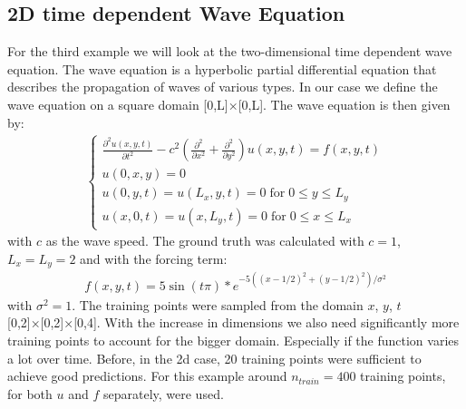 \documentclass{article}
\begin{document}
\subsection{2D time dependent Wave Equation}
For the third example we will look at the two-dimensional time dependent wave equation. The wave equation is a hyperbolic partial differential equation that describes the propagation of waves of various types. In our case we define the wave equation on a square domain [0,L]×[0,L]. The wave equation is then given by:
\begin{equation}
    \begin{aligned}
{\displaystyle {\begin{cases}    \frac{\partial^2 u(x,y,t)}{\partial t^2} - c^2\left(\frac{\partial^2}{\partial x^2} +\frac{\partial^2}{\partial y^2}\right)u(x,y,t) = f(x,y,t) \\ 
    u(0,x,y) = 0\\ 
    u(0,y,t)=u(L_x,y,t)=0 \; \mathrm{for} \;0 \leq y \leq L_y\\
    u(x,0,t)=u(x,L_y,t)=0 \; \mathrm{for}\; 0 \leq x \leq L_x
    \end{cases}}}
    \end{aligned}
\end{equation}
with $c$ as the wave speed. The ground truth was calculated with $c = 1$, $L_x = L_y = 2$ and with the forcing term:
\begin{align}
  f(x,y,t) = 5\sin(t\pi)*e^{-5((x - 1/2)^2 + (y - 1/2)^2)/\sigma^2}  
\end{align}
with $\sigma^2 = 1$. The training points were sampled from the domain $x$, $y$, $t$ [0,2]×[0,2]×[0,4]. With the increase in dimensions we also need significantly more training points to account for the bigger domain. Especially if the function varies a lot over time. Before, in the 2d case, 20 training points were sufficient to achieve good predictions. For this example around $n_{train} = 400$ training points, for both $u$ and $f$ separately, were used.
\end{document}
